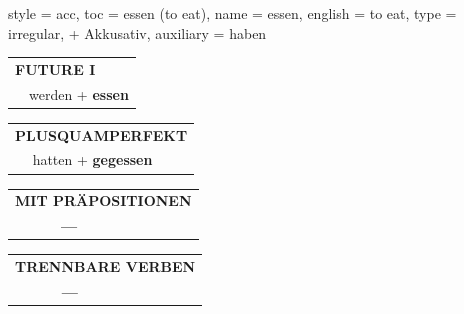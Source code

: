 \begin{verbentry}{
  style = {acc},
  toc = {essen (to eat)},
  name = {essen},
  english = {to eat},
  type = {irregular, + Akkusativ},
  auxiliary = {haben}
}
\begin{tabular}{rl}
    \multicolumn{2}{l}{\textbf{FUTURE I} }\\
  &  werden + \textbf{essen}\\
 
  \end{tabular}
\hfill
   \begin{tabular}{rl}
      \multicolumn{2}{l}{\textbf{PLUSQUAMPERFEKT}}\\
   & hatten + \textbf{gegessen}\\
  \end{tabular}
  
  
\vspace{10pt}

\begin{tabular}{lll}
\multicolumn{3}{l}{\textbf{MIT PRÄPOSITIONEN}}\\
& \textbf{---} & \\
\end{tabular}
\hfill
\begin{tabular}{lll}
\multicolumn{3}{l}{\textbf{TRENNBARE VERBEN}}\\
& \textbf{---} & \\
\end{tabular}
\vspace{-5pt}
\end{verbentry}

